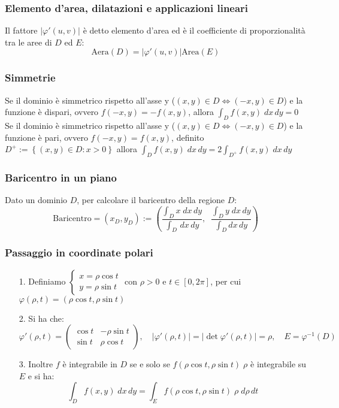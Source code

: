 \documentclass[a4paper]{article}
\begin{document}
\subsubsection*{Elemento d'area, dilatazioni e applicazioni lineari}
Il fattore \(\left| \varphi'(u,v) \right|\) è detto elemento d'area ed è il coefficiente di proporzionalità tra le aree di \(D\) ed \(E\):
\[\text{Aera}(D) = \left| \varphi'(u,v) \right| \text{Area}(E)\]

\subsubsection*{Simmetrie}
Se il dominio è simmetrico rispetto all'asse y (\((x,y) \in D \Leftrightarrow (-x,y) \in D\)) e la funzione è dispari, ovvero \(f(-x,y) = -f(x,y)\),
allora \(\displaystyle \int_D f(x,y) \; dx \, dy = 0\) \\
Se il dominio è simmetrico rispetto all'asse y (\((x,y) \in D \Leftrightarrow (-x,y) \in D\)) e la funzione è pari, ovvero \(f(-x,y) = f(x,y)\), 
definito \(D^+ := \left\{(x,y) \in D : x > 0\right\}\) allora \(\displaystyle \int_D f(x,y) \; dx \, dy = 2 \int_{D^+} f(x,y) \; dx \, dy\)

\subsubsection*{Baricentro in un piano}
Dato un dominio \(D\), per calcolare il baricentro della regione \(D\):
\[\text{Baricentro} = (x_D, y_D) := \left( \frac{\displaystyle \int_D x \; dx \, dy}{\displaystyle \int_D \, dx \, dy}, \;\; \frac{\displaystyle \int_D y \; dx \, dy}{\displaystyle \int_D dx \, dy} \right)\]

\subsubsection*{Passaggio in coordinate polari}
\begin{itemize}
	\item[1.] Definiamo \(\begin{cases} x = \rho \cos t \\ y = \rho \sin t \end{cases}\) con \(\rho > 0\) e \(t \in [0, 2\pi]\), per cui \(\varphi(\rho,t) = (\rho \cos t, \rho \sin t)\)
	\item[2.] Si ha che: \(\varphi'(\rho,t) = \left( \begin{matrix} \cos t & - \rho \sin t \\ \sin t & \rho \cos t \end{matrix} \right), \quad \left|\varphi'(\rho,t)\right| = \left|\det \varphi'(\rho,t)\right| = \rho, \quad E = \varphi^{-1}(D)\)
	\item[3.] Inoltre \(f\) è integrabile in \(D\) se e solo se \(f(\rho \cos t, \rho \sin t) \; \rho\) è integrabile su \(E\) e si ha:
	\[\displaystyle \int_D f(x,y) \; dx \, dy =  \int_E f(\rho \cos t, \rho \sin t) \; \rho \; d\rho \, dt\]
\end{itemize}
\end{document}
